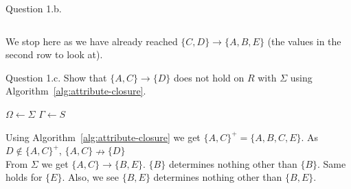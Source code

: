 \documentclass{beamer}
\begin{document}
\begin{frame}{Question 1.b.}
\begin{columns}
\begin{table}
    \caption*{\tiny $\{C,D\}\to\{A,B\}$}
    \label{tab:chasing_cd_ab}
\end{table}
\pause
{}
    \begin{table}
    \centering
    \caption*{\tiny $\{A,C,D\}\to\{E\}$}
    \label{tab:chasing_cd_ab}
\end{table}
\end{columns}
We stop here as we have already reached $\{C,D\}\to \{A,B,E\}$ (the values in the second row to look at).
\end{frame}

\begin{frame}{Question 1.c.}
\small
Show that $\{A,C\}\to \{D\}$ does not hold on $R$ with $\Sigma$ using Algorithm~\ref{alg:attribute-closure}.
\scriptsize
\begin{algorithm}[H]
\caption{Attribute Closure Algorithm}
\label{alg:attribute-closure}


$\Omega \gets \Sigma$
$\Gamma \gets S$


\Return{$\Gamma$}\;

\end{algorithm}
Using Algorithm~\ref{alg:attribute-closure} we get $\{A,C\}^+ = \{A,B,C,E\}$. As $D\notin \{A,C\}^+$, $\{A,C\} \nrightarrow \{D\}$\\
From $\Sigma$ we get $\{A,C\}\to \{B,E\}$. $\{B\}$ determines nothing other than $\{B\}$. Same holds for $\{E\}$. Also, we see $\{B,E\}$ determines nothing other than $\{B,E\}$.

\end{frame}
\end{document}
